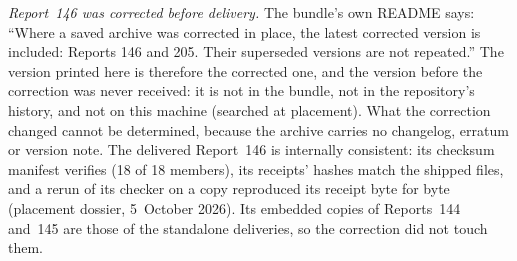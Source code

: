 \documentclass[11pt,letterpaper]{article}
\theoremstyle{remark}\newtheorem{remark}[theorem]{Remark}
\numberwithin{equation}{section}
\begin{document}
\emph{Report~146 was corrected before delivery.} The bundle's own README says: ``Where a saved archive was corrected in place, the latest corrected version is included: Reports 146 and 205. Their superseded versions are not repeated.'' The version printed here is therefore the corrected one, and the version before the correction was never received: it is not in the bundle, not in the repository's history, and not on this machine (searched at placement). What the correction changed cannot be determined, because the archive carries no changelog, erratum or version note. The delivered Report~146 is internally consistent: its checksum manifest verifies (18 of 18 members), its receipts' hashes match the shipped files, and a rerun of its checker on a copy reproduced its receipt byte for byte (placement dossier, 5~October 2026). Its embedded copies of Reports~144 and~145 are those of the standalone deliveries, so the correction did not touch them.
\end{document}
